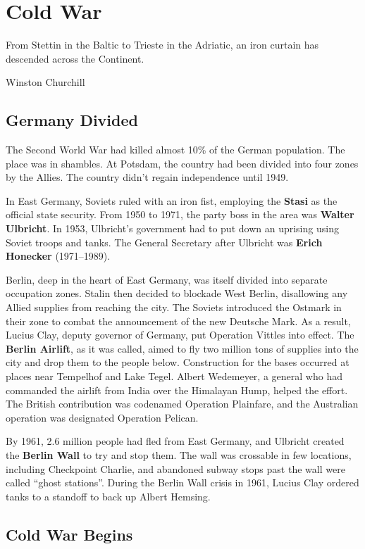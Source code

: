 \chapter{Cold War}

\epigraph{%
  From Stettin in the Baltic to Trieste in the Adriatic, an iron curtain has descended across the Continent.
}{Winston Churchill}

\section{Germany Divided}

The Second World War had killed almost 10\% of the German population.
The place was in shambles.
At Potsdam, the country had been divided into four zones by the Allies.
The country didn't regain independence until 1949.

In East Germany, Soviets ruled with an iron fist, employing the \textbf{Stasi} as the official state security.
From 1950 to 1971, the party boss in the area was \textbf{Walter Ulbricht}.
In 1953, Ulbricht's government had to put down an uprising using Soviet troops and tanks.
The General Secretary after Ulbricht was \textbf{Erich Honecker} (1971--1989).

Berlin, deep in the heart of East Germany, was itself divided into separate occupation zones.
Stalin then decided to blockade West Berlin, disallowing any Allied supplies from reaching the city.
The Soviets introduced the Ostmark in their zone to combat the announcement of the new Deutsche Mark.
As a result, Lucius Clay, deputy governor of Germany, put Operation Vittles into effect.
The \textbf{Berlin Airlift}, as it was called,
aimed to fly two million tons of supplies into the city and drop them to the people below.
Construction for the bases occurred at places near Tempelhof and Lake Tegel.
Albert Wedemeyer, a general who had commanded the airlift from India over the Himalayan Hump, helped the effort.
The British contribution was codenamed Operation Plainfare,
and the Australian operation was designated Operation Pelican.

By 1961, 2.6 million people had fled from East Germany,
and Ulbricht created the \textbf{Berlin Wall} to try and stop them.
The wall was crossable in few locations, including Checkpoint Charlie,
and abandoned subway stops past the wall were called ``ghost stations''.
During the Berlin Wall crisis in 1961, Lucius Clay ordered tanks to a standoff to back up Albert Hemsing.

\section{Cold War Begins}

